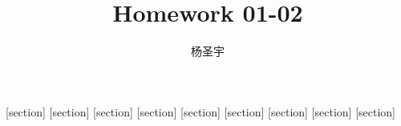 \documentclass[11pt,a4paper,titlepage,openany]{book}
\begin{document}
\pagestyle{fancy}
\fancyhf{}
\fancyhead[EL,OR]{\thepage}
\fancyhead[OC]{\nouppercase{\heiti\rightmark}}
\fancyhead[EC]{\nouppercase{\heiti\leftmark}}
\theoremstyle{plain}
[section]
\newenvironment{Proposition}[1][]{{\par\normalfont\bfseries 命题~\stepcounter{Proposition}\arabic{Proposition}#1~~}\kaishu}{\par}
[section]
\newenvironment{Corollary}[1][]{{\par\normalfont\bfseries 推论~\stepcounter{Corollary}\arabic{Corollary}#1~~}\kaishu}{\par}
[section]
\newenvironment{Theorem}[1][]{{\par\normalfont\bfseries 定理~\stepcounter{Theorem}\arabic{Theorem}#1~~}\kaishu}{\par}
[section]
\newenvironment{Lemma}[1][]{{\par\normalfont\bfseries 引理~\stepcounter{Lemma}\arabic{Lemma}#1~~}\kaishu}{\par}
[section]
\newenvironment{Property}[1][]{{\par\normalfont\bfseries 性质~\stepcounter{Property}\arabic{Property}#1~~}\kaishu}{\par}
[section]
\newenvironment{Assertion}[1][]{{\par\normalfont\bfseries 断语~\stepcounter{Assertion}\arabic{Assertion}#1~~}\kaishu}{\par}
\newenvironment{Proof}{{\par{\heiti 证明}~~}}{\hfill $\square$ \par\hfill\par}
[section]
\newenvironment{Example}[1][]{{\par\normalfont\bfseries 例~\stepcounter{Example}\arabic{Example}#1~~}\songti}{\hfill\par\hfill\par}
[section]
\newenvironment{Def}[1][]{{\par\normalfont\bfseries 定义~\stepcounter{Def}\arabic{Def}#1~~\songti}}{\par}
[section]
\newenvironment{Note}[1][]{{\par\normalfont\bfseries 注~\stepcounter{Note}\arabic{Note}#1~~}\songti}{\par}
\title{{\heiti Homework 01-02}}
\author{杨圣宇}
\maketitle
\end{document}
